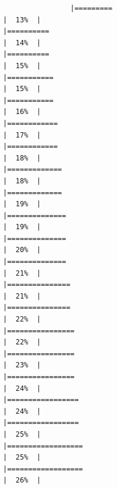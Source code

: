 \documentclass[
]{article}
\begin{document}
\begin{verbatim}
                |=========                                                             |  13%  |                                                                              |==========                                                            |  14%  |                                                                              |==========                                                            |  15%  |                                                                              |===========                                                           |  15%  |                                                                              |===========                                                           |  16%  |                                                                              |============                                                          |  17%  |                                                                              |============                                                          |  18%  |                                                                              |=============                                                         |  18%  |                                                                              |=============                                                         |  19%  |                                                                              |==============                                                        |  19%  |                                                                              |==============                                                        |  20%  |                                                                              |==============                                                        |  21%  |                                                                              |===============                                                       |  21%  |                                                                              |===============                                                       |  22%  |                                                                              |================                                                      |  22%  |                                                                              |================                                                      |  23%  |                                                                              |================                                                      |  24%  |                                                                              |=================                                                     |  24%  |                                                                              |=================                                                     |  25%  |                                                                              |==================                                                    |  25%  |                                                                              |==================                                                    |  26%  |                                                               
\end{verbatim}
\end{document}
